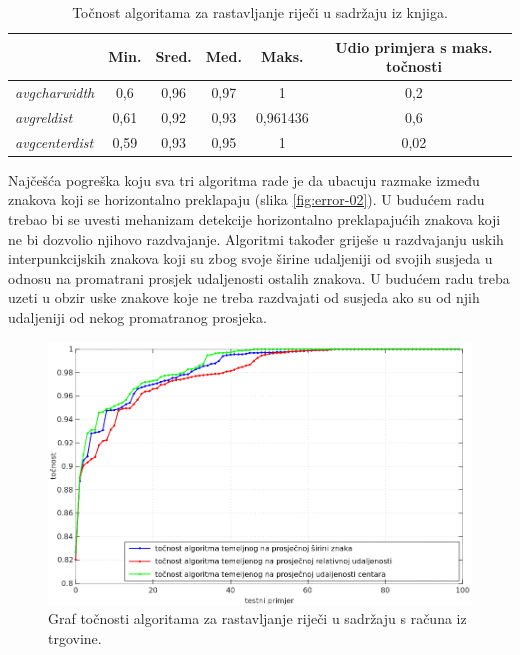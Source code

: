 \documentclass[times, utf8, zavrsni]{fer}
\begin{document}
\begin{table}[htb]
\caption{Točnost algoritama za rastavljanje riječi u sadržaju iz knjiga.}
\label{tbl:result-03}
\centering
\begin{tabular}{lccccc} \hline
& Min. & Sred. & Med. & Maks. & Udio primjera s maks. točnosti \\ \hline
\emph{avgcharwidth} & 0,6 & 0,96 & 0,97 & 1 & 0,2 \\
\emph{avgreldist} & 0,61 & 0,92 & 0,93 & 0,961436 & 0,6 \\
\emph{avgcenterdist} & 0,59 & 0,93 & 0,95 & 1 & 0,02 \\ \hline
\end{tabular}
\end{table}

Najčešća pogreška koju sva tri algoritma rade je da ubacuju razmake između
znakova koji se horizontalno preklapaju (slika \ref{fig:error-02}). U budućem
radu trebao bi se uvesti mehanizam detekcije horizontalno preklapajućih znakova
koji ne bi dozvolio njihovo razdvajanje. Algoritmi također griješe u
razdvajanju uskih interpunkcijskih znakova koji su zbog svoje širine udaljeniji
od svojih susjeda u odnosu na promatrani prosjek udaljenosti ostalih znakova. U
budućem radu treba uzeti u obzir uske znakove koje ne treba razdvajati od
susjeda ako su od njih udaljeniji od nekog promatranog prosjeka.

\begin{figure}[htb]
    \centering
    \captionsetup{justification=centering,margin=2cm}
    \includegraphics[width=\textwidth]{images/result-03.png}
    \caption{
        Graf točnosti algoritama za rastavljanje riječi u sadržaju s računa iz
        trgovine.
    }
    \label{fig:result-03}
\end{figure}
\end{document}
